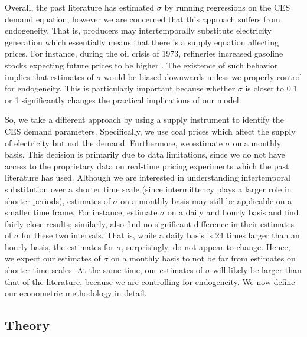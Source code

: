 \documentclass[11pt,a4paper,leqno]{extarticle}
\begin{document}
	Overall, the past literature has estimated $\sigma$ by running regressions on the CES demand equation, however we are concerned that this approach suffers from endogeneity. That is, producers may intertemporally substitute electricity generation which essentially means that there is a supply equation affecting prices. For instance, during the oil crisis of 1973, refineries increased gasoline stocks expecting future prices to be higher \citep{genie}. The existence of such behavior implies that estimates of $\sigma$ would be biased downwards unless we properly control for endogeneity. This is particularly important because whether $\sigma$ is closer to 0.1 or 1 significantly changes the practical implications of our model. 
	
	So, we take a different approach by using a supply instrument to identify the CES demand parameters. Specifically, we use coal prices which affect the supply of electricity but not the demand. Furthermore, we estimate $\sigma$ on a monthly basis. This decision is primarily due to data limitations, since we do  not have access to the proprietary data on real-time pricing experiments which the past literature has used. Although we are interested in understanding intertemporal substitution over a shorter time scale (since intermittency plays a larger role in shorter periods), estimates of $\sigma$ on a monthly basis may still be applicable on a smaller time frame. For instance, \citet{Schwarz} estimate $\sigma$ on a daily and hourly basis and find fairly close results; similarly, \citet{Herriges} also find no significant difference in their estimates of $\sigma$ for these two intervals. That is, while a daily basis is 24 times larger than an hourly basis, the estimates for $\sigma$, surprisingly, do not appear to change. Hence, we expect our estimates of $\sigma$ on a monthly basis to not be far from estimates on shorter time scales. At the same time, our estimates of $\sigma$ will likely be larger than that of the literature, because we are controlling for endogeneity. We now define our econometric methodology in detail.
	
	\subsection{Theory}
	
\end{document}
